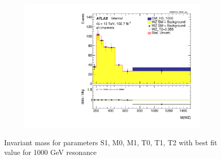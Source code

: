 \documentclass[../Bachelorarbeit.tex]{subfiles}
\begin{document}
\begin{figure}[h]
\begin{subfigure}{0.45\textwidth}
    \end{subfigure}
    \begin{subfigure}{0.45\textwidth}
        \includegraphics[width=\textwidth]{Plots/ALL_MWZ_right_color/GM_H5_1000/T2/2022-05-07/VBSSR/all_VV_MWZ_vbs.pdf}
    \end{subfigure}

    \caption{Invariant mass for parameters S1, M0, M1, T0, T1, T2 with best fit value for 1000 GeV resonance}
    \label{fig:all_mwz_1000}
\end{figure}
\end{document}
